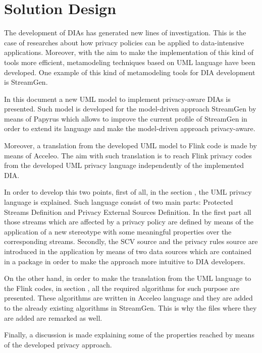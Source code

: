 \chapter[Solution Design]{Solution Design}
\label{sec:chapter4}

The development of DIAs has generated new lines of investigation. This is the case of researches about how privacy policies can be applied to data-intensive applications. Moreover, with the aim to make the implementation of this kind of tools more efficient, metamodeling techniques based on UML language have been developed. One example of this kind of metamodeling tools for DIA development is StreamGen.

In this document a new UML model to implement privacy-aware DIAs is presented. Such model is developed for the model-driven approach StreamGen by means of Papyrus which allows to improve the current profile of StreamGen in order to extend its language and make the model-driven approach privacy-aware.

Moreover, a translation from the developed UML model to Flink code is made by means of Acceleo. The aim with such translation is to reach Flink privacy codes from the developed UML privacy language independently of the implemented DIA.

In order to develop this two points, first of all, in the section , the UML privacy language is explained. Such language consist of two main parts: Protected Streams Definition and Privacy External Sources Definition. In the first part all those streams which are affected by a privacy policy are defined by means of the application of a new stereotype with some meaningful properties over the corresponding streams. Secondly, the SCV source and the privacy rules source are introduced in the application by means of two data sources which are contained in a package in order to make the approach more intuitive to DIA developers.

On the other hand, in order to make the translation from the UML language to the Flink codes, in section , all the required algorithms for such purpose are presented. These algorithms are written in Acceleo language and they are added to the already existing algorithms in StreamGen. This is why the files where they are added are remarked as well.

Finally, a discussion is made explaining some of the properties reached by means of the developed privacy approach.

